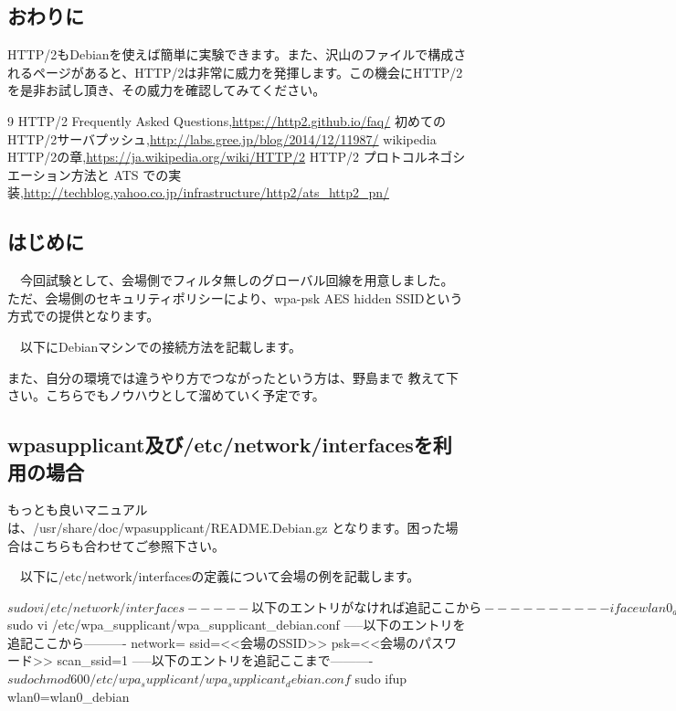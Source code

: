 \documentclass[mingoth,a4paper]{jsarticle}
\begin{document}
\subsection{おわりに}

  HTTP/2もDebianを使えば簡単に実験できます。また、沢山のファイルで構成されるページがあると、HTTP/2は非常に威力を発揮します。この機会にHTTP/2を是非お試し頂き、その威力を確認してみてください。
  
\begin{thebibliography}{9}
 HTTP/2 Frequently Asked Questions,\url{https://http2.github.io/faq/}
 初めてのHTTP/2サーバプッシュ,\url{http://labs.gree.jp/blog/2014/12/11987/}
 wikipedia HTTP/2の章,\url{https://ja.wikipedia.org/wiki/HTTP/2}
 HTTP/2 プロトコルネゴシエーション方法と ATS での実装,\url{http://techblog.yahoo.co.jp/infrastructure/http2/ats_http2_pn/}
\end{thebibliography}
   
 \subsection{はじめに}

　今回試験として、会場側でフィルタ無しのグローバル回線を用意しました。
ただ、会場側のセキュリティポリシーにより、wpa-psk AES hidden SSIDという
方式での提供となります。

　以下にDebianマシンでの接続方法を記載します。

 また、自分の環境では違うやり方でつながったという方は、野島まで
教えて下さい。こちらでもノウハウとして溜めていく予定です。

 \subsection{wpasupplicant及び/etc/network/interfacesを利用の場合}

 もっとも良いマニュアルは、/usr/share/doc/wpasupplicant/README.Debian.gz
となります。困った場合はこちらも合わせてご参照下さい。

　以下に/etc/network/interfacesの定義について会場の例を記載します。

\begin{commandline}
$ sudo vi /etc/network/interfaces
-----以下のエントリがなければ追記ここから----------
iface wlan0_debian inet dhcp
     wpa-conf /etc/wpa_supplicant/wpa_supplicant_debian.conf
-----以下のエントリがなければ追記ここまで----------
$ sudo vi /etc/wpa_supplicant/wpa_supplicant_debian.conf
-----以下のエントリを追記ここから----------
network={
     ssid=<<会場のSSID>>
     psk=<<会場のパスワード>>
     scan_ssid=1
}
-----以下のエントリを追記ここまで----------
$ sudo chmod 600 /etc/wpa_supplicant/wpa_supplicant_debian.conf
$ sudo ifup wlan0=wlan0_debian
\end{commandline}
\end{document}
